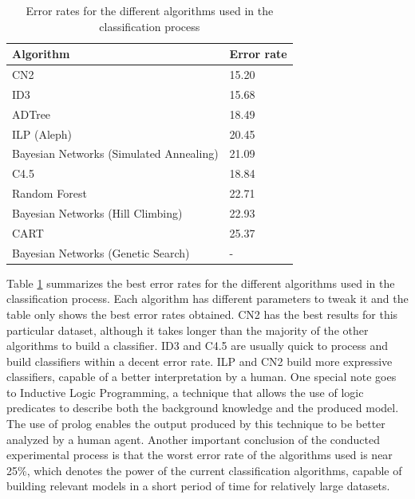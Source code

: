 \documentclass[a4paper]{llncs}
\begin{document}
\begin{table}
    \begin{center}
    \begin{tabular}{ | l | l | }
    \hline
    \textbf{Algorithm} & \textbf{Error rate} \\ \hline
    CN2 & 15.20 \\ \hline
    ID3 & 15.68 \\ \hline
    ADTree & 18.49 \\ \hline
    ILP (Aleph) & 20.45 \\ \hline
    Bayesian Networks (Simulated Annealing) & 21.09 \\ \hline
    C4.5 & 18.84 \\ \hline
    Random Forest & 22.71 \\ \hline
    Bayesian Networks (Hill Climbing) & 22.93 \\ \hline
    CART & 25.37 \\ \hline
    Bayesian Networks (Genetic Search) & - \\ \hline
    \end{tabular}
    \caption{Error rates for the different algorithms used in the classification process}
    \label{tbl:overall_results}
    \end{center}
\end{table}

Table \ref{tbl:overall_results} summarizes the best error rates for the 
different algorithms used in the classification process. Each algorithm has 
different parameters to tweak it and the table only shows the best error rates
obtained. CN2 has the best results for this particular dataset, although it
takes longer than the majority of the other algorithms to build a classifier. 
ID3 and C4.5 are usually quick to process and build classifiers within a decent
error rate. ILP and CN2 build more expressive classifiers, capable of a better
interpretation by a human. One special note goes to Inductive Logic Programming,
a technique that allows the use of logic predicates to describe both the 
background knowledge and the produced model. The use of prolog enables the 
output produced by this technique to be better analyzed by a human agent. 
Another important conclusion of the conducted experimental process is that the 
worst error rate of the algorithms used is near 25\%, which denotes the power
of the current classification algorithms, capable of building relevant models in
a short period of time for relatively large datasets.
\end{document}
